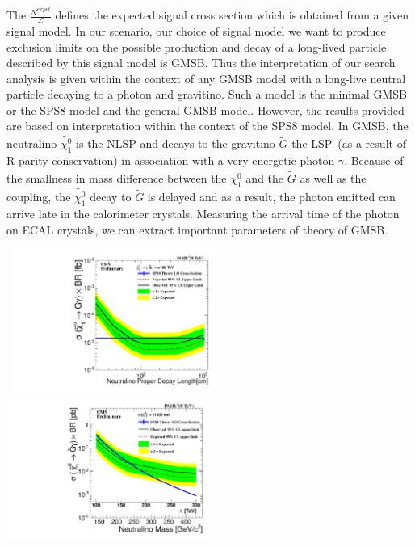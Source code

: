 \par
The $\frac{N^{expet}}{\mathscr{L}}$ defines the expected signal cross section which is obtained from a given signal model. In our scenario, our choice of signal model we  want to produce exclusion limits on the possible production and decay of a long-lived particle described by this signal model is GMSB.
Thus the interpretation of our search analysis is given within the context of any GMSB model with a long-live neutral particle decaying to a photon and gravitino. Such a model is the minimal GMSB or the SPS8 model and the general GMSB model. However, the results provided are based on interpretation within the context of the SPS8 model.
In GMSB, the neutralino $\tilde{\chi^{0}_{1}}$ is the NLSP and decays to the gravitino $\tilde{G}$ the LSP~(as a result of R-parity conservation) in association with a very energetic photon $\gamma$. Because of the smallness in mass difference between the  $\tilde{\chi^{0}_{1}}$ and the $\tilde{G}$ as well as the coupling, the $\tilde{\chi^{0}_{1}}$ decay to $\tilde{G}$ is delayed and as a result, the photon emitted can arrive late in the calorimeter crystals.  Measuring the arrival time of the photon on ECAL crystals, we can extract important parameters of  theory of GMSB.




\begin{center}
\centering
\mbox{
\includegraphics[height=0.5\textwidth, width=0.5\textwidth]{THESISPLOTS/180TeV_Neutralino_CrossSecTimesBR_Uplimit.pdf}
\includegraphics[height=0.5\textwidth,width=0.5\textwidth]{THESISPLOTS/Neutralino_CrosSecVsMass_Exclusion_limit_11000.pdf}}
\label{fig:SPS8_Ctau_Ulimit}
\end{center}


